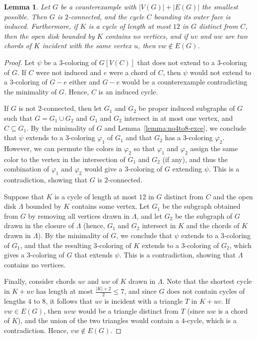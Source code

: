 \documentclass[12pt,twoside,openright,a4paper]{book}
\newtheorem{lemma}[theorem]{Lemma}
\begin{document}
\begin{lemma}\label{lemma:no4to8-prop}
Let $G$ be a counterexample with $|V(G)|+|E(G)|$ the smallest possible.  Then $G$ is $2$-connected,
and the cycle $C$ bounding its outer face is induced.  Furthermore, if $K$ is a cycle
of length at most $12$ in $G$ distinct from $C$, then the open disk bounded by $K$ contains no
vertices, and if $uv$ and $uw$ are two chords of $K$ incident with the same vertex $u$,
then $vw\not\in E(G)$.
\end{lemma}
\begin{proof}
Let $\psi$ be a $3$-coloring of $G[V(C)]$ that does not extend to a $3$-coloring of $G$.
If $C$ were not induced and $e$ were a chord of $C$, then $\psi$ would not extend to a $3$-coloring of $G-e$
either and $G-e$ would be a counterexample contradicting the minimality of $G$.  Hence, $C$ is an induced
cycle.

If $G$ is not $2$-connected, then let $G_1$ and $G_2$ be proper induced subgraphs of $G$
such that $G=G_1\cup G_2$ and $G_1$ and $G_2$ intersect in at most one vertex, and $C\subseteq G_1$.
By the minimality of $G$ and Lemma~\ref{lemma:no4to8-exce}, we conclude that $\psi$ extends to a $3$-coloring $\varphi_1$ of $G_1$
and that $G_2$ has a $3$-coloring $\varphi_2$.  However, we can permute the colors in $\varphi_2$ so that $\varphi_1$ and $\varphi_2$
assign the same color to the vertex in the intersection of $G_1$ and $G_2$ (if any), and thus the combination of $\varphi_1$
and $\varphi_2$ would give a $3$-coloring of $G$ extending $\psi$.  This is a contradiction, showing that $G$ is $2$-connected.

Suppose that $K$ is a cycle of length at most $12$ in $G$ distinct from $C$ and the open disk $\Lambda$ bounded by $K$ contains some
vertex.  Let $G_1$ be the subgraph obtained from $G$ by removing all vertices drawn in $\Lambda$, and let $G_2$ be the subgraph
of $G$ drawn in the closure of $\Lambda$ (hence, $G_1$ and $G_2$ intersect in $K$ and the chords of $K$ drawn in $\Lambda$).
By the minimality of $G$, we conclude that $\psi$ extends to a $3$-coloring of $G_1$, and that the resulting $3$-coloring of $K$
extends to a $3$-coloring of $G_2$, which gives a $3$-coloring of $G$ that extends $\psi$.  This is a contradiction,
showing that $\Lambda$ contains no vertices.

Finally, consider chords $uv$ and $uw$ of $K$ drawn in $\Lambda$.  Note that the shortest cycle in $K+uv$ has length
at most $\frac{|K|+2}{2}\le 7$, and since $G$ does not contain cycles of lengths $4$ to $8$, it follows that $uv$ is incident
with a triangle $T$ in $K+uv$.  If $vw\in E(G)$, then $uvw$ would be a triangle distinct from $T$ (since $uw$ is a chord of $K$),
and the union of the two triangles would contain a $4$-cycle, which is a contradiction.  Hence, $vw\not\in E(G)$.
\end{proof}
\end{document}
